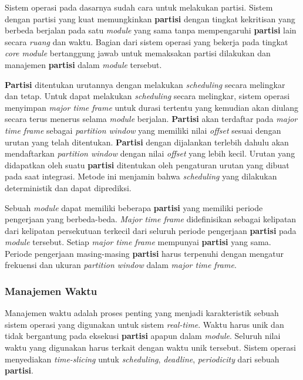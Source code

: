 Sistem operasi pada dasarnya sudah cara untuk melakukan partisi.
Sistem dengan partisi yang kuat memungkinkan \textbf{partisi} dengan tingkat kekritisan yang berbeda berjalan pada satu \textit{module} yang sama tanpa mempengaruhi \textbf{partisi} lain secara \textit{ruang} dan waktu.
Bagian dari sistem operasi yang bekerja pada tingkat \textit{core module} bertanggung jawab untuk memaksakan partisi dilakukan dan manajemen \textbf{partisi} dalam \textit{module} tersebut.

\textbf{Partisi} ditentukan urutannya dengan melakukan \textit{scheduling} secara melingkar dan tetap.
Untuk dapat melakukan \textit{scheduling} secara melingkar, sistem operasi menyimpan \textit{major time frame} untuk durasi tertentu yang kemudian akan diulang secara terus menerus selama \textit{module} berjalan.
\textbf{Partisi} akan terdaftar pada \textit{major time frame} sebagai \textit{partition window} yang memiliki nilai \textit{offset} sesuai dengan urutan yang telah ditentukan.
\textbf{Partisi} dengan dijalankan terlebih dahulu akan mendaftarkan \textit{partition window} dengan nilai \textit{offset} yang lebih kecil.
Urutan yang didapatkan oleh suatu \textbf{partisi} ditentukan oleh pengaturan urutan yang dibuat pada saat integrasi.
Metode ini menjamin bahwa \textit{scheduling} yang dilakukan deterministik dan dapat diprediksi.

Sebuah \textit{module} dapat memiliki beberapa \textbf{partisi} yang memiliki periode pengerjaan yang berbeda-beda.
\textit{Major time frame} didefinisikan sebagai kelipatan dari kelipatan persekutuan terkecil dari seluruh periode pengerjaan \textbf{partisi} pada \textit{module} tersebut.
Setiap \textit{major time frame} mempunyai \textbf{partisi} yang sama.
Periode pengerjaan masing-masing \textbf{partisi} harus terpenuhi dengan mengatur frekuensi dan ukuran \textit{partition window} dalam \textit{major time frame}.

\subsubsection{Manajemen Waktu}

Manajemen waktu adalah proses penting yang menjadi karakteristik sebuah sistem operasi yang digunakan untuk sistem \textit{real-time}.
Waktu harus unik dan tidak bergantung pada eksekusi \textbf{partisi} apapun dalam \textit{module}.
Seluruh nilai waktu yang digunakan harus terkait dengan waktu unik tersebut.
Sistem operasi menyediakan \textit{time-slicing} untuk \textit{scheduling}, \textit{deadline}, \textit{periodicity} dari sebuah \textbf{partisi}.

